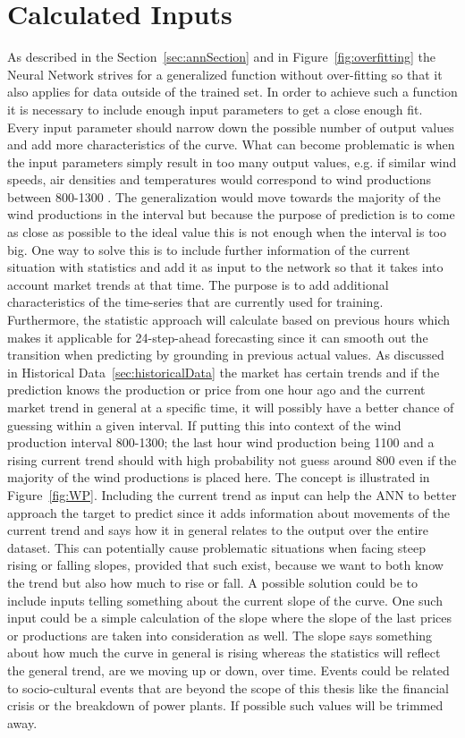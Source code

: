\section{Calculated Inputs}
\label{sec:usingStatisticalInput}
As described in the Section~\ref{sec:annSection} and in Figure~\ref{fig:overfitting} the Neural Network strives for a generalized function without over-fitting so that it also applies for data outside of the trained set. In order to achieve such a function it is necessary to include enough input parameters to get a close enough fit. Every input parameter should narrow down the possible number of output values and add more characteristics of the curve. What can become problematic is when the input parameters simply result in too many output values, e.g. if similar wind speeds, air densities and temperatures would correspond to wind productions between 800-1300 . The generalization would move towards the majority of the wind productions in the interval but because the purpose of prediction is to come as close as possible to the ideal value this is not enough when the interval is too big. One way to solve this is to include further information of the current situation with statistics and add it as input to the network so that it takes into account market trends at that time. The purpose is to add additional characteristics of the time-series that are currently used for training. Furthermore, the statistic approach will calculate based on previous hours which makes it applicable for 24-step-ahead forecasting since it can smooth out the transition when predicting by grounding in previous actual values. As discussed in Historical Data~\ref{sec:historicalData} the market has certain trends and if the prediction knows the production or price from one hour ago and the current market trend in general at a specific time, it will possibly have a better chance of guessing within a given interval. If putting this into context of the wind production interval 800-1300; the last hour wind production being 1100 and a rising current trend should with high probability not guess around 800 even if the majority of the wind productions is placed here. The concept is illustrated in Figure~\ref{fig:WP}. Including the current trend as input can help the ANN to better approach the target to predict since it adds information about movements of the current trend and says how it in general relates to the output over the entire dataset. This can potentially cause problematic situations when facing steep rising or falling slopes, provided that such exist, because we want to both know the trend but also how much to rise or fall. A possible solution could be to include inputs telling something about the current slope of the curve. One such input could be a simple calculation of the slope where the slope of the last prices or productions are taken into consideration as well. The slope says something about how much the curve in general is rising whereas the statistics will reflect the general trend, are we moving up or down, over time. Events could be related to socio-cultural events that are beyond the scope of this thesis like the financial crisis or the breakdown of power plants. If possible such values will be trimmed away.

